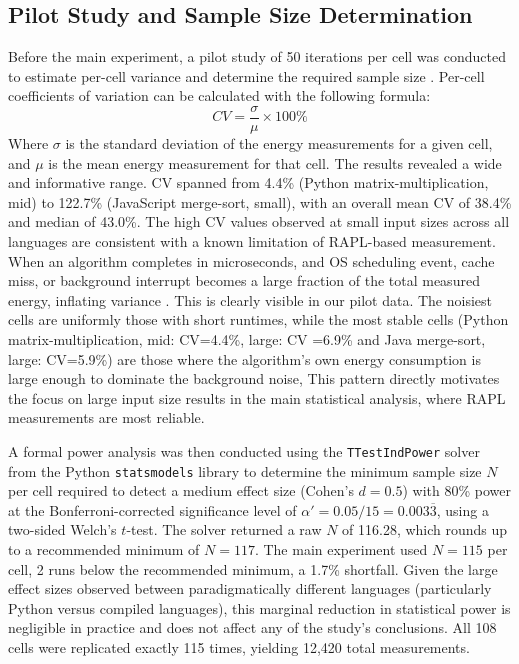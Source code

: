 \subsection{Pilot Study and Sample Size Determination}
Before the main experiment, a pilot study of 50 iterations per cell was conducted to estimate per-cell variance and determine the required sample size \cite{Shechtman2013}. Per-cell coefficients of variation can be calculated with the following formula:
\begin{equation}
    CV = \frac{\sigma}{\mu} \times 100\%
    \label{eq:cv}
\end{equation}
Where $\sigma$ is the standard deviation of the energy measurements for a given cell, and $\mu$ is the mean energy measurement for that cell. The results revealed a wide and informative range. CV spanned from 4.4\% (Python matrix-multiplication, mid) to 122.7\% (JavaScript merge-sort, small), with an overall mean CV of 38.4\% and median of 43.0\%.
The high CV values observed at small input sizes across all languages are consistent with a known limitation of RAPL-based measurement. When an algorithm completes in microseconds, and OS scheduling event, cache miss, or background interrupt becomes a large fraction of the total measured energy, inflating variance \cite{10.1145/2425248.2425252}. This is clearly visible in our pilot data. The noisiest cells are uniformly those with short runtimes, while the most stable cells (Python matrix-multiplication, mid: CV=4.4\%, large: CV =6.9\% and Java merge-sort, large: CV=5.9\%) are those where the algorithm's own energy consumption is large enough to dominate the background noise, This pattern directly motivates the focus on large input size results in the main statistical analysis, where RAPL measurements are most reliable. 

A formal power analysis was then conducted using the \texttt{TTestIndPower} solver from the Python \texttt{statsmodels} library \cite{seabold2010} to determine the minimum sample size $N$ per cell required to detect a medium effect size (Cohen's $d = 0.5$) with 80\% power at the Bonferroni-corrected significance level of $\alpha' = 0.05/15 = 0.003\overline{3}$, using a two-sided Welch's $t$-test. The solver returned a raw $N$ of 116.28, which rounds up to a recommended minimum of $N = 117$. The main experiment used $N = 115$ per cell, 2 runs below the recommended minimum, a 1.7\% shortfall. Given the large effect sizes observed between paradigmatically different languages (particularly Python versus compiled languages), this marginal reduction in statistical power is negligible in practice and does not affect any of the study's conclusions. All 108 cells were replicated exactly 115 times, yielding 12,420 total measurements.



